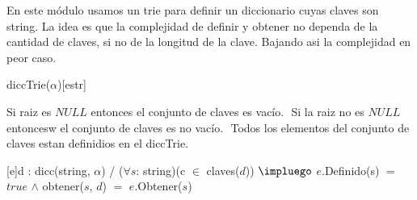 \pagebreak

\begin{Representacion}
  
  
	En este m\'odulo usamos un trie para definir un diccionario cuyas claves son string.
$ $\newline La idea es que la complejidad de definir y obtener no dependa de la cantidad de claves, si no de la longitud de la clave. Bajando asi la complejidad en peor caso.  
  
  \begin{Estructura}{diccTrie($\alpha$)}[estr]
    \begin{Tupla}[estr]
    \end{Tupla}

    \begin{Tupla}[nodo]
    \end{Tupla}
  \end{Estructura}


Si raiz es $NULL$ entonces el conjunto de claves es vac\'io. $ $\newline
Si la raiz no es $NULL$ entoncesw el conjunto de claves es no vac\'io. $ $\newline
Todos los elementos del conjunto de claves estan definidios en el diccTrie.
$ $\newline
 
 
  [e]{d : dicc(string, $\alpha$) / ($\forall s$: string)(c $\in$ claves($d$)) $\impluego$ $e$.Definido(s) $=$ $true$ $\land$ obtener($s$, $d$) $=$ $e$.Obtener($s$) }



\end{Representacion}

